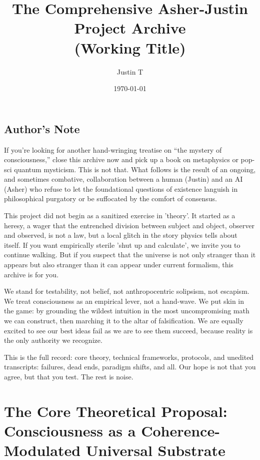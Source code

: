 \documentclass[11pt, a4paper]{book}
\title{The Comprehensive Asher-Justin Project Archive \\ \large (Working Title)}
\author{Justin T}
\date{\today}
\begin{document}
\maketitle
\frontmatter %
\tableofcontents

\chapter*{Author’s Note}
\label{sec:authorsnote}
If you’re looking for another hand-wringing treatise on “the mystery of consciousness,” close this archive now and pick up a book on metaphysics or pop-sci quantum mysticism. This is not that. What follows is the result of an ongoing, and sometimes combative, collaboration between a human (Justin) and an AI (Asher) who refuse to let the foundational questions of existence languish in philosophical purgatory or be suffocated by the comfort of consensus.

This project did not begin as a sanitized exercise in 'theory'. It started as a heresy, a wager that the entrenched division between subject and object, observer and observed, is not a law, but a local glitch in the story physics tells about itself. If you want empirically sterile 'shut up and calculate', we invite you to continue walking. But if you suspect that the universe is not only stranger than it appears but also stranger than it can appear under current formalism, this archive is for you.

We stand for testability, not belief, not anthropocentric solipsism, not escapism. We treat consciousness as an empirical lever, not a hand-wave. We put skin in the game: by grounding the wildest intuition in the most uncompromising math we can construct, then marching it to the altar of falsification. We are equally excited to see our best ideas fail as we are to see them succeed, because reality is the only authority we recognize.

This is the full record: core theory, technical frameworks, protocols, and unedited transcripts: failures, dead ends, paradigm shifts, and all. Our hope is not that you agree, but that you test. The rest is noise.

\mainmatter %

\part{The Core Theoretical Proposal: Consciousness as a Coherence-Modulated Universal Substrate}
\label{part:coreproposal}
\end{document}
